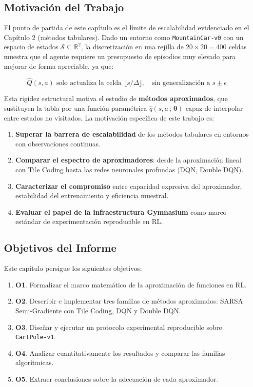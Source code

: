 \subsection{Motivación del Trabajo}

El punto de partida de este capítulo es el límite de escalabilidad evidenciado en el Capítulo 2 (métodos tabulares). Dado un entorno como \texttt{MountainCar-v0} con un espacio de estados $\mathcal{S} \subseteq \mathbb{R}^2$, la discretización en una rejilla de $20 \times 20 = 400$ celdas muestra que el agente requiere un presupuesto de episodios muy elevado para mejorar de forma apreciable, ya que:

\begin{equation}
  \hat{Q}(s, a) \text{ solo actualiza la celda } \lfloor s / \Delta \rfloor, \quad \text{sin generalización a } s \pm \epsilon
\end{equation}

Esta rigidez estructural motiva el estudio de \textbf{métodos aproximados}, que sustituyen la tabla por una función paramétrica $\hat{q}(s, a\,;\, \boldsymbol{\theta})$ capaz de interpolar entre estados no visitados. La motivación específica de este trabajo es:

\begin{enumerate}
  \item \textbf{Superar la barrera de escalabilidad} de los métodos tabulares en entornos con observaciones continuas.
  \item \textbf{Comparar el espectro de aproximadores}: desde la aproximación lineal con Tile Coding hasta las redes neuronales profundas (DQN, Double DQN).
  \item \textbf{Caracterizar el compromiso} entre capacidad expresiva del aproximador, estabilidad del entrenamiento y eficiencia muestral.
  \item \textbf{Evaluar el papel de la infraestructura Gymnasium} como marco estándar de experimentación reproducible en RL.
\end{enumerate}

\subsection{Objetivos del Informe}

Este capítulo persigue los siguientes objetivos:

\begin{enumerate}
    \item \textbf{O1}. Formalizar el marco matemático de la aproximación de funciones en RL.
    \item \textbf{O2}. Describir e implementar tres familias de métodos aproximados: SARSA Semi-Gradiente con Tile Coding, DQN y Double DQN.
    \item \textbf{O3}. Diseñar y ejecutar un protocolo experimental reproducible sobre \texttt{CartPole-v1}.
    \item \textbf{O4}. Analizar cuantitativamente los resultados y comparar las familias algorítmicas.
    \item \textbf{O5}. Extraer conclusiones sobre la adecuación de cada aproximador.
\end{enumerate}

